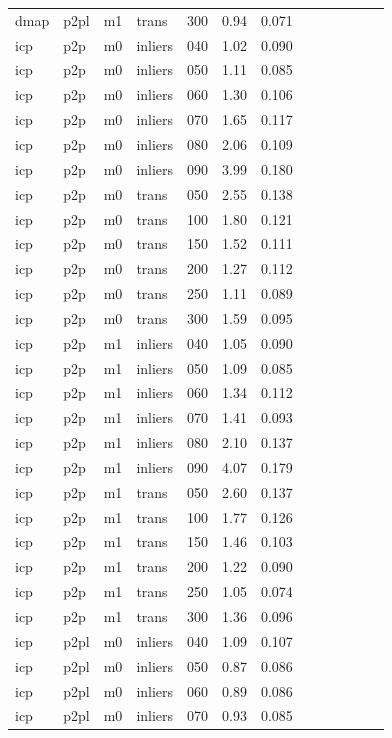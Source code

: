 \begin{table}[htbp]
\begin{tabular}{lllllrrrrrrrr}
  dmap & p2pl & m1 & trans & 300 & 0.94 & 0.071 \\
  icp & p2p & m0 & inliers & 040 & 1.02 & 0.090 \\
  icp & p2p & m0 & inliers & 050 & 1.11 & 0.085 \\
  icp & p2p & m0 & inliers & 060 & 1.30 & 0.106 \\
  icp & p2p & m0 & inliers & 070 & 1.65 & 0.117 \\
  icp & p2p & m0 & inliers & 080 & 2.06 & 0.109 \\
  icp & p2p & m0 & inliers & 090 & 3.99 & 0.180 \\
  icp & p2p & m0 & trans & 050 & 2.55 & 0.138 \\
  icp & p2p & m0 & trans & 100 & 1.80 & 0.121 \\
  icp & p2p & m0 & trans & 150 & 1.52 & 0.111 \\
  icp & p2p & m0 & trans & 200 & 1.27 & 0.112 \\
  icp & p2p & m0 & trans & 250 & 1.11 & 0.089 \\
  icp & p2p & m0 & trans & 300 & 1.59 & 0.095 \\
  icp & p2p & m1 & inliers & 040 & 1.05 & 0.090 \\
  icp & p2p & m1 & inliers & 050 & 1.09 & 0.085 \\
  icp & p2p & m1 & inliers & 060 & 1.34 & 0.112 \\
  icp & p2p & m1 & inliers & 070 & 1.41 & 0.093 \\
  icp & p2p & m1 & inliers & 080 & 2.10 & 0.137 \\
  icp & p2p & m1 & inliers & 090 & 4.07 & 0.179 \\
  icp & p2p & m1 & trans & 050 & 2.60 & 0.137 \\
  icp & p2p & m1 & trans & 100 & 1.77 & 0.126 \\
  icp & p2p & m1 & trans & 150 & 1.46 & 0.103 \\
  icp & p2p & m1 & trans & 200 & 1.22 & 0.090 \\
  icp & p2p & m1 & trans & 250 & 1.05 & 0.074 \\
  icp & p2p & m1 & trans & 300 & 1.36 & 0.096 \\
  icp & p2pl & m0 & inliers & 040 & 1.09 & 0.107 \\
  icp & p2pl & m0 & inliers & 050 & 0.87 & 0.086 \\
  icp & p2pl & m0 & inliers & 060 & 0.89 & 0.086 \\
  icp & p2pl & m0 & inliers & 070 & 0.93 & 0.085 \\

\end{tabular}
\end{table}
